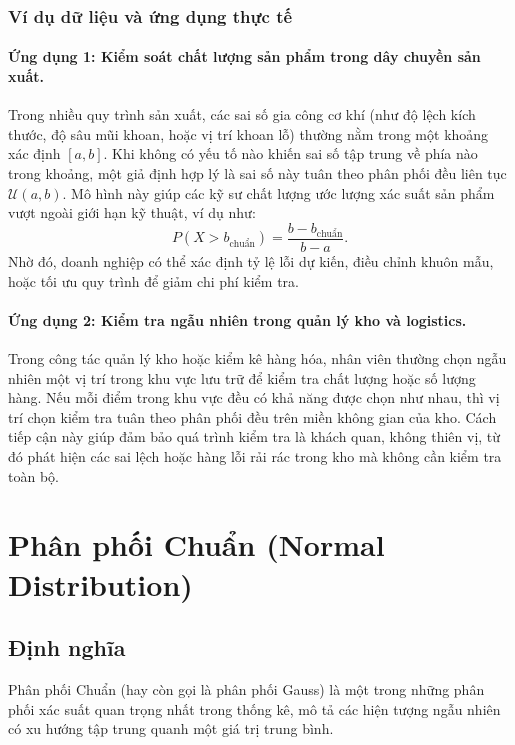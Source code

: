 \documentclass[a4paper,12pt]{article}
\begin{document}
\subsubsection{Ví dụ dữ liệu và ứng dụng thực tế}

\paragraph{Ứng dụng 1: Kiểm soát chất lượng sản phẩm trong dây chuyền sản xuất.} 
Trong nhiều quy trình sản xuất, các sai số gia công cơ khí (như độ lệch kích thước, độ sâu mũi khoan, hoặc vị trí khoan lỗ) thường nằm trong một khoảng xác định \([a, b]\). Khi không có yếu tố nào khiến sai số tập trung về phía nào trong khoảng, một giả định hợp lý là sai số này tuân theo phân phối đều liên tục \(\mathcal{U}(a, b)\). 
Mô hình này giúp các kỹ sư chất lượng ước lượng xác suất sản phẩm vượt ngoài giới hạn kỹ thuật, ví dụ như:
\[
P(X > b_{\text{chuẩn}}) = \frac{b - b_{\text{chuẩn}}}{b - a}.
\]
Nhờ đó, doanh nghiệp có thể xác định tỷ lệ lỗi dự kiến, điều chỉnh khuôn mẫu, hoặc tối ưu quy trình để giảm chi phí kiểm tra.

\paragraph{Ứng dụng 2: Kiểm tra ngẫu nhiên trong quản lý kho và logistics.} 
Trong công tác quản lý kho hoặc kiểm kê hàng hóa, nhân viên thường chọn ngẫu nhiên một vị trí trong khu vực lưu trữ để kiểm tra chất lượng hoặc số lượng hàng. Nếu mỗi điểm trong khu vực đều có khả năng được chọn như nhau, thì vị trí chọn kiểm tra tuân theo phân phối đều trên miền không gian của kho. 
Cách tiếp cận này giúp đảm bảo quá trình kiểm tra là khách quan, không thiên vị, từ đó phát hiện các sai lệch hoặc hàng lỗi rải rác trong kho mà không cần kiểm tra toàn bộ.

\section{Phân phối Chuẩn (Normal Distribution)}

\subsection{Định nghĩa}

Phân phối Chuẩn (hay còn gọi là phân phối Gauss) là một trong những phân phối xác suất quan trọng nhất trong thống kê, mô tả các hiện tượng ngẫu nhiên có xu hướng tập trung quanh một giá trị trung bình.  
\end{document}
